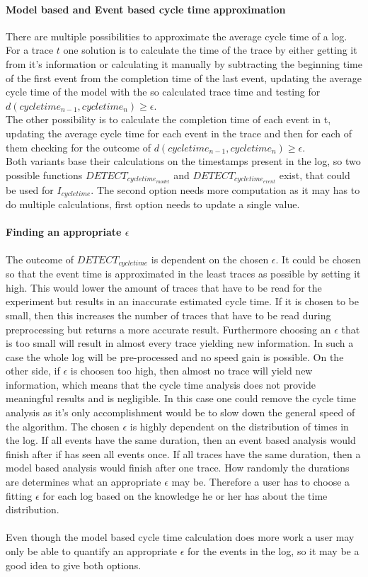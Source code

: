 \documentclass[
	a4paper,
	pagesize,
	pdftex,
	12pt,
	twoside, %
	BCOR=5mm, %
	ngerman,
	fleqn,
	final,
	]{scrartcl}
\begin{document}
\paragraph{Model based and Event based cycle time approximation} There are multiple possibilities to approximate the average cycle time of a log. For a trace $t$ one solution is to calculate the time of the trace by either getting it from it's information or calculating it manually by subtracting the beginning time of the first event from the completion time of the last event, updating the average cycle time of the model with the so calculated trace time and testing for $d(cycle time_{n-1}, cycle time_n)\geq \epsilon$.\\
The other possibility is to calculate the completion time of each event in t, updating the average cycle time for each event in the trace and then for each of them checking for the outcome of $d(cycle time_{n-1}, cycle time_n)\geq \epsilon$.\\
Both variants base their calculations on the timestamps present in the log, so two possible functions $DETECT_{cycle time_{model}}$ and $DETECT_{cycle time_{event}}$ exist, that could be used for $I_{cycle time}$.
The second option needs more computation as it may has to do multiple calculations, first option needs to update a single value.
\paragraph{Finding an appropriate $\epsilon$}
The outcome of $DETECT_{cycle time}$ is dependent on the chosen $\epsilon$. It could be chosen so that the event time is approximated in the least traces as possible by setting it high. This would lower the amount of traces that have to be read for the experiment but results in an inaccurate estimated cycle time. If it is chosen to be small, then this increases the number of traces that have to be read during preprocessing but returns a more accurate result. Furthermore choosing an $\epsilon$ that is too small will result in almost every trace yielding new information. In such a case the whole log will be pre-processed and no speed gain is possible. On the other side, if $\epsilon$ is choosen too high, then almost no trace will yield new information, which means that the cycle time analysis does not provide meaningful results and is negligible. In this case one could remove the cycle time analysis as it's only accomplishment would be to slow down the general speed of the algorithm. The chosen $\epsilon$ is highly dependent on the distribution of times in the log. If all events have the same duration, then an event based analysis would finish after if has seen all events once. If all traces have the same duration, then a model based analysis would finish after one trace. How randomly the durations are determines what an appropriate $\epsilon$ may be. Therefore a user has to choose a fitting $\epsilon$ for each log based on the knowledge he or her has about the time distribution.\\\\ Even though the model based cycle time calculation does more work a user may only be able to quantify an appropriate $\epsilon$ for the events in the log, so it may be a good idea to give both options.
\end{document}
